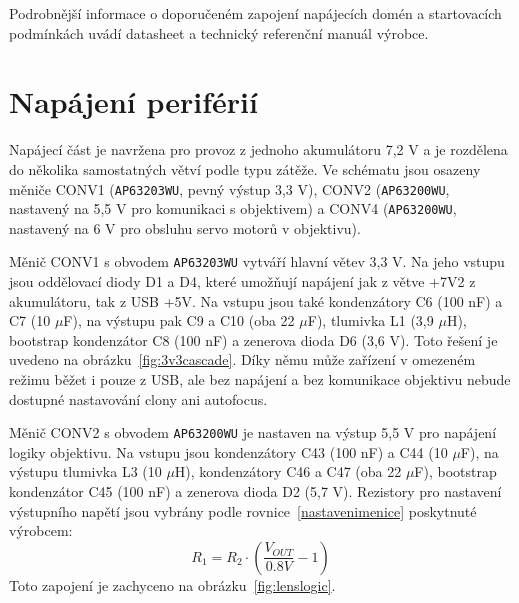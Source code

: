 \documentclass[12pt, a4paper, oneside]{report}
\begin{document}
Podrobnější informace o doporučeném zapojení napájecích domén a startovacích podmínkách uvádí datasheet a technický referenční manuál výrobce\cite{esp32p4_trm,esp32p4_ds}.


\section{Napájení periférií}
Napájecí část je navržena pro provoz z jednoho akumulátoru 7,2 V a je rozdělena do několika samostatných větví podle typu zátěže\cite{local_readme}. Ve schématu jsou osazeny měniče CONV1 (\texttt{AP63203WU}, pevný výstup 3,3 V), CONV2 (\texttt{AP63200WU}, nastavený na 5,5 V pro komunikaci s objektivem) a CONV4 (\texttt{AP63200WU}, nastavený na 6 V pro obsluhu servo motorů v objektivu)\cite{ap63200,local_kicad}.

Měnič CONV1 s obvodem \texttt{AP63203WU} vytváří hlavní větev 3,3 V. Na jeho vstupu jsou oddělovací diody D1 a D4, které umožňují napájení jak z větve +7V2 z akumulátoru, tak z USB +5V. Na vstupu jsou také kondenzátory C6 (100 nF) a C7 (10 $\mu$F), na výstupu pak C9 a C10 (oba 22 $\mu$F), tlumivka L1 (3,9 $\mu$H), bootstrap kondenzátor C8 (100 nF) a zenerova dioda D6 (3,6 V). Toto řešení je uvedeno na obrázku~\ref{fig:3v3cascade}. Díky němu může zařízení v omezeném režimu běžet i pouze z USB, ale bez napájení a bez komunikace objektivu nebude dostupné nastavování clony ani autofocus.

Měnič CONV2 s obvodem \texttt{AP63200WU} je nastaven na výstup 5,5 V pro napájení logiky objektivu. Na vstupu jsou kondenzátory C43 (100 nF) a C44 (10 $\mu$F), na výstupu tlumivka L3 (10 $\mu$H), kondenzátory C46 a C47 (oba 22 $\mu$F), bootstrap kondenzátor C45 (100 nF) a zenerova dioda D2 (5,7 V). Rezistory pro nastavení výstupního napětí jsou vybrány podle rovnice~\ref{nastavenimenice} poskytnuté výrobcem:
\begin{equation}
R_{1} = R_{2} \cdot \left(\frac{V_{OUT}}{0.8V}-1 \right)
\label{nastavenimenice}
\end{equation}
Toto zapojení je zachyceno na obrázku~\ref{fig:lenslogic}.
\end{document}
